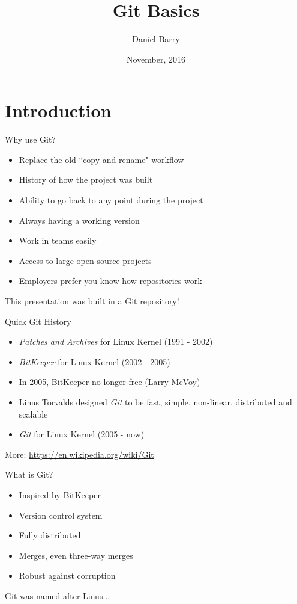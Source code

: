 \documentclass{beamer}
\title{Git Basics}
\date{November, 2016}
\author{Daniel Barry}
\institute{University of Hertfordshire}
\begin{document}
  \maketitle
  \section{Introduction}
  \begin{frame}{Why use Git?}
    \begin{itemize}
      \item Replace the old ``copy and rename" workflow
      \item History of how the project was built
      \item Ability to go back to any point during the project
      \item Always having a working version
      \item Work in teams easily
      \item Access to large open source projects
      \item Employers prefer you know how repositories work
    \end{itemize}
    This presentation was built in a Git repository!
  \end{frame}
  \begin{frame}{Quick Git History}
    \begin{itemize}
      \item \emph{Patches and Archives} for Linux Kernel (1991 - 2002)
      \item \emph{BitKeeper} for Linux Kernel (2002 - 2005)
      \item In 2005, BitKeeper no longer free (Larry McVoy)
      \item Linus Torvalds designed \emph{Git} to be fast, simple, non-linear,
        distributed and scalable
      \item \emph{Git} for Linux Kernel (2005 - now)
    \end{itemize}
    More:
    \url{https://en.wikipedia.org/wiki/Git}
  \end{frame}
  \begin{frame}{What is Git?}
    \begin{itemize}
      \item Inspired by BitKeeper
      \item Version control system
      \item Fully distributed
      \item Merges, even three-way merges
      \item Robust against corruption
    \end{itemize}
    Git was named after Linus...
  \end{frame}
\end{document}
